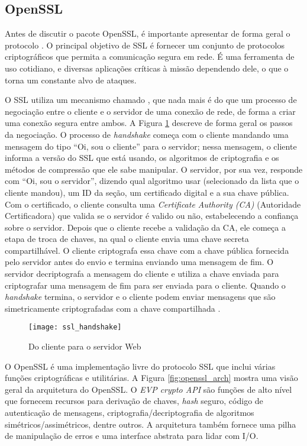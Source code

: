 \subsection{OpenSSL}
\label{sec:openssl}

Antes de discutir o pacote OpenSSL, é importante apresentar de forma geral o
protocolo . O principal objetivo de
SSL é fornecer um conjunto de protocolos criptográficos que permita a
comunicação segura em rede. É uma ferramenta de uso cotidiano, e diversas
aplicações críticas à missão dependendo dele, o que o torna um constante alvo
de ataques.

O SSL utiliza um mecanismo chamado , que
nada mais é do que um processo de negociação entre o cliente e o servidor de uma conexão de rede, de
forma a criar uma conexão segura entre ambos. A Figura
\ref{fig:openssl_handshake} descreve de forma geral os passos da negociação. O
processo de \emph{handshake} começa com o cliente mandando uma mensagem do
tipo ``Oi, sou o cliente'' para o servidor; nessa mensagem, o cliente informa a
versão do SSL que está usando, os algoritmos de criptografia e os métodos de
compressão que ele sabe manipular. O servidor, por sua vez, responde com ``Oi, sou o
servidor'', dizendo qual algoritmo usar (selecionado da lista que o cliente
mandou), um ID da seção, um certificado digital e a sua chave pública. Com o
certificado, o cliente consulta uma \emph{Certificate Authority (CA)}
(Autoridade Certificadora) que valida se o servidor é valido ou não,
estabelecendo a confiança sobre o servidor. Depois que o cliente recebe a
validação da CA, ele começa a etapa de troca de chaves, na qual o cliente envia
uma chave secreta compartilhável. O cliente criptografa essa chave com a chave
pública fornecida pelo servidor antes do envio e termina enviando uma mensagem de
fim. O servidor decriptografa a mensagem do cliente e utiliza a chave enviada
para criptografar uma mensagem de fim para ser enviada para o cliente. Quando
o \emph{handshake} termina, o servidor e o cliente podem enviar mensagens que
são simetricamente criptografadas com a chave compartilhada \citep{openssl}.

\begin{figure}[!h]
  \centering
  \texttt{[image: ssl\_handshake]}
  \caption{Do cliente para o servidor Web}
  \label{fig:openssl_handshake}
\end{figure}

O OpenSSL é uma implementação livre do protocolo SSL que
inclui várias funções criptográficas e utilitárias. A Figura
\ref{fig:openssl_arch} mostra uma visão geral da arquitetura do OpenSSL. O
\emph{EVP crypto API} são funções de alto nível que fornecem recursos para
derivação de chaves, \emph{hash} seguro, código de autenticação de mensagens,
criptografia/decriptografia de algoritmos simétricos/assimétricos, dentre outros. A
arquitetura também fornece uma pilha de manipulação de erros e uma interface
abstrata para lidar com I/O.

